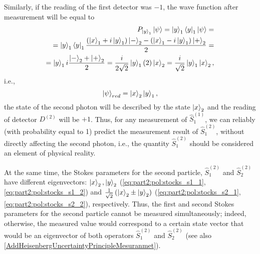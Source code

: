 Similarly, if the reading of the first detector was $-1$, the
wave function after measurement will be equal to
\begin{eqnarray}
  P_{\ket{y}_1}\left|\psi\right> =
  \ket{y}_1\bra{y}_1 \left|\psi\right> =
  \nonumber \\
  =
  \ket{y}_1\bra{y}_1
  \frac{
    \left( \ket{x}_1 + i \ket{y}_1 \right)\ket{ - }_2 -
    \left( \ket{x}_1 - i \ket{y}_1 \right)\ket{ + }_2
  }{2} =
  \nonumber \\
  =
  \ket{y}_1 i 
  \frac{\ket{ - }_2 + \ket{ + }_2}{2} =
  \frac{i}{2\sqrt{2}}\ket{y}_1 \left(2\right)
  \ket{x}_2 =
  \frac{i}{\sqrt{2}}\ket{y}_1\ket{x}_2,
  \nonumber
\end{eqnarray}
i.e.,
\[
\left|\psi\right>_{red} = \ket{x}_2\ket{y}_1,
\]
the state of the second photon will be described by the state
$\ket{x}_2$ and the reading of detector $D^{(2)}$ will be $+1$.
Thus, for any measurement of $\hat{S}_1^{(1)}$, we can
reliably (with probability equal to 1) predict the measurement result of
$\hat{S}_1^{(2)}$, without directly affecting the second photon, i.e.,
the quantity $\hat{S}_1^{(2)}$ should be considered an element
of physical reality.

At the same time, the Stokes parameters for the second particle,  $\hat{S}_1^{(2)}$ and
$\hat{S}_2^{(2)}$ have 
different eigenvectors:
$\ket{x}_2, \ket{y}_2$ (\ref{eq:part2:pol:stocks_s1_1},
  \ref{eq:part2:pol:stocks_s1_2}) and
$\frac{1}{\sqrt{2}}\left(\ket{x}_2 \pm
\ket{y}_2\right)$ (\ref{eq:part2:pol:stocks_s2_1},
  \ref{eq:part2:pol:stocks_s2_2}), respectively.
Thus, the first and second Stokes parameters for the second particle
cannot be measured simultaneously; indeed, otherwise,
the measured value would correspond to  
a certain state vector that would be an eigenvector of both
operators $\hat{S}_1^{(2)}$ and
$\hat{S}_2^{(2)}$ (see also
\autoref{AddHeisenbergUncertaintyPrincipleMesuranmet}). 



